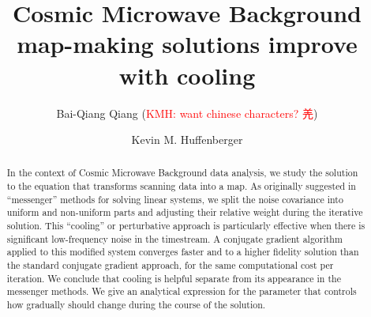 \documentclass[twocolumn,linenumbers]{aastex631}
\newcommand{\kmh}[1]{\textcolor{red}{KMH: #1}}
\begin{document}
\title{Cosmic Microwave Background map-making solutions improve with cooling}


  \author{Bai-Qiang Qiang (\kmh{want chinese characters? 羌})} %

\author[0000-0001-7109-0099]{Kevin M. Huffenberger}

 
\begin{abstract}

  In the context of Cosmic Microwave Background data analysis, we study the solution to the equation that transforms scanning data into a map.  As originally suggested in ``messenger'' methods for solving linear systems, we split the  noise covariance into uniform and non-uniform parts and adjusting their relative weight during the iterative solution.  This ``cooling'' or perturbative approach is particularly effective when there is significant low-frequency noise in the timestream.  A conjugate gradient algorithm applied to this modified system converges faster and to a higher fidelity solution than the standard conjugate gradient approach, for the same computational cost per iteration.  We conclude that cooling is helpful separate from its appearance in the messenger methods.
%
We give an analytical expression for the parameter that controls how gradually should change during the course of the solution. 

\end{abstract}

\end{document}
